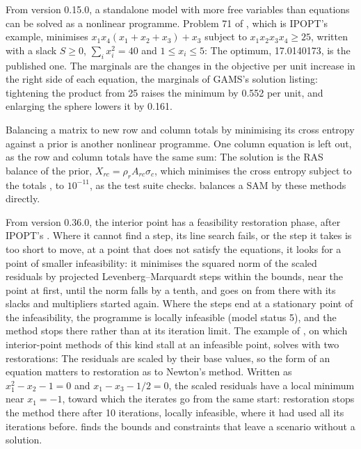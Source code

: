 From version 0.15.0, a standalone model with more free variables than
equations can be solved as a nonlinear programme. Problem 71 of
\citet{hock1981}, which is IPOPT's example, minimises $x_1 x_4 (x_1 + x_2 +
x_3) + x_3$ subject to $x_1 x_2 x_3 x_4 \ge 25$, written with a slack $S \ge
0$, $\sum_i x_i^2 = 40$ and $1 \le x_i \le 5$:
The optimum, 17.0140173, is the published one. The marginals are the
changes in the objective per unit increase in the right side of each
equation, the marginals of GAMS's solution listing: tightening the product
from 25 raises the minimum by 0.552 per unit, and enlarging the sphere lowers
it by 0.161.

Balancing a matrix to new row and column totals by minimising its cross
entropy against a prior is another nonlinear programme. One column equation
is left out, as the row and column totals have the same sum:
The solution is the RAS balance of the prior, $X_{rc} = \rho_r A_{rc}
\sigma_c$, which minimises the cross entropy subject to the totals
\citep{mcdougall1999}, to $10^{-11}$, as the test suite checks.
 balances a SAM by these methods directly.


From version 0.36.0, the interior point has a feasibility restoration phase,
after IPOPT's \citep{wachter2006}. Where it cannot find a step, its line
search fails, or the step it takes is too short to move, at a point that
does not satisfy the equations, it looks for a point of smaller
infeasibility: it minimises the squared norm of the scaled residuals by
projected Levenberg--Marquardt steps within the bounds, near the point at
first, until the norm falls by a tenth, and goes on from there with its
slacks and multipliers started again. Where the steps end at a stationary
point of the infeasibility, the programme is locally infeasible (model
status 5), and the method stops there rather than at its iteration limit.
The example of \citet{wachter2000}, on which interior-point methods of this
kind stall at an infeasible point, solves with two restorations:
The residuals are scaled by their base values, so the form of an equation
matters to restoration as to Newton's method. Written as $x_1^2 - x_2 - 1 =
0$ and $x_1 - x_3 - 1/2 = 0$, the scaled residuals have a local minimum near
$x_1 = -1$, toward which the iterates go from the same start: restoration
stops the method there after 10 iterations, locally infeasible, where it
had used all its iterations before.  finds the bounds and
constraints that leave a scenario without a solution.

